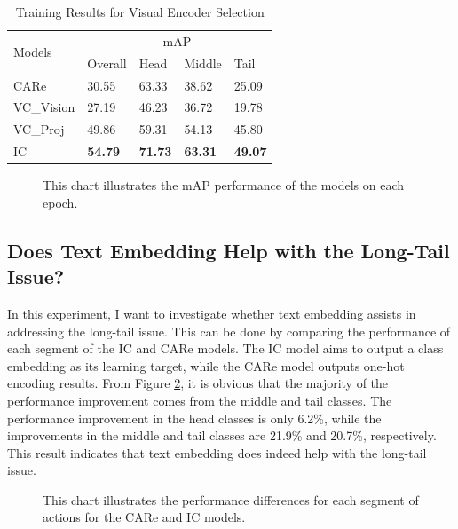 \begin{table}[ht]
    \centering
    \caption{Training Results for Visual Encoder Selection}
    \label{tab:resultsbackbone}
    \begin{tabular}{lllll}
        \toprule
        \multirow{2}{*}{Models} & \multicolumn{4}{c}{mAP} \\
        \cmidrule{2-5} 
        {} & Overall & Head  & Middle & Tail \\
        \midrule
        CARe        & 30.55   & 63.33 & 38.62 & 25.09 \\
        VC\_Vision  & 27.19   & 46.23 & 36.72 & 19.78 \\
        VC\_Proj    & 49.86   & 59.31 & 54.13 & 45.80 \\
        IC          & \textbf{54.79}   & \textbf{71.73} & \textbf{63.31} & \textbf{49.07} \\
        \bottomrule
    \end{tabular}
\end{table}

\begin{figure}[ht]
    \centering
    \resizebox{1.0\textwidth}{!}{}
    \caption[mAP performance on each epoch for VC\_Vision, VC\_Proj, and IC]{This chart illustrates the mAP performance of the models on each epoch.}
    \label{fig:tp_backbone}
\end{figure}

\subsection{Does Text Embedding Help with the Long-Tail Issue?}
In this experiment, I want to investigate whether text embedding assists in addressing the long-tail issue. This can be done by comparing the performance of each segment of the IC and CARe models. The IC model aims to output a class embedding as its learning target, while the CARe model outputs one-hot encoding results. From Figure \ref{fig:tp_longtailcomp}, it is obvious that the majority of the performance improvement comes from the middle and tail classes. The performance improvement in the head classes is only 6.2\%, while the improvements in the middle and tail classes are 21.9\% and 20.7\%, respectively. This result indicates that text embedding does indeed help with the long-tail issue. 

\begin{figure}[ht]
    \centering
    \resizebox{1.0\textwidth}{!}{}
    \caption[mAP performance on the best epoch for CARe and IC]{This chart illustrates the performance differences for each segment of actions for the CARe and IC models.}
    \label{fig:tp_longtailcomp}
\end{figure}

